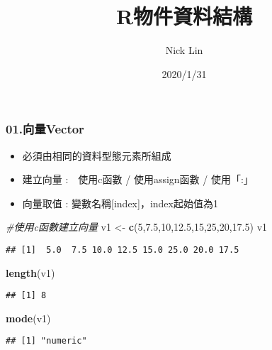 \documentclass[
]{article}
\title{R物件資料結構}
\author{Nick Lin}
\date{2020/1/31}
\newenvironment{Shaded}{\begin{snugshade}}{\end{snugshade}}
\newcommand{\CommentTok}[1]{\textcolor[rgb]{0.56,0.35,0.01}{\textit{#1}}}
\newcommand{\DecValTok}[1]{\textcolor[rgb]{0.00,0.00,0.81}{#1}}
\newcommand{\FloatTok}[1]{\textcolor[rgb]{0.00,0.00,0.81}{#1}}
\newcommand{\KeywordTok}[1]{\textcolor[rgb]{0.13,0.29,0.53}{\textbf{#1}}}
\newcommand{\NormalTok}[1]{#1}
\newcommand{\StringTok}[1]{\textcolor[rgb]{0.31,0.60,0.02}{#1}}
\providecommand{\tightlist}{%
  \setlength{\itemsep}{0pt}\setlength{\parskip}{0pt}}
\begin{document}
\maketitle

\hypertarget{ux5411ux91cfvector}{%
\subsubsection{01.向量Vector}\label{ux5411ux91cfvector}}

\begin{itemize}
\tightlist
\item
  必須由相同的資料型態元素所組成
\item
  建立向量 :　使用c函數 / 使用assign函數 / 使用「:」
\item
  向量取值 : 變數名稱{[}index{]}，index起始值為1
\end{itemize}

\begin{Shaded}
\begin{Highlighting}[]
\CommentTok{#使用c函數建立向量}
\NormalTok{v1 <-}\StringTok{ }\KeywordTok{c}\NormalTok{(}\DecValTok{5}\NormalTok{,}\FloatTok{7.5}\NormalTok{,}\DecValTok{10}\NormalTok{,}\FloatTok{12.5}\NormalTok{,}\DecValTok{15}\NormalTok{,}\DecValTok{25}\NormalTok{,}\DecValTok{20}\NormalTok{,}\FloatTok{17.5}\NormalTok{)}
\NormalTok{v1}
\end{Highlighting}
\end{Shaded}

\begin{verbatim}
## [1]  5.0  7.5 10.0 12.5 15.0 25.0 20.0 17.5
\end{verbatim}

\begin{Shaded}
\begin{Highlighting}[]
\KeywordTok{length}\NormalTok{(v1)}
\end{Highlighting}
\end{Shaded}

\begin{verbatim}
## [1] 8
\end{verbatim}

\begin{Shaded}
\begin{Highlighting}[]
\KeywordTok{mode}\NormalTok{(v1)}
\end{Highlighting}
\end{Shaded}

\begin{verbatim}
## [1] "numeric"
\end{verbatim}
\end{document}
